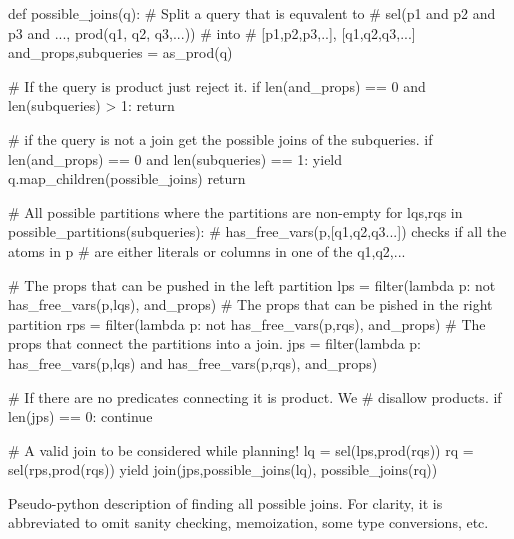 \begin{code}
  \begin{pycode}
    def possible_joins(q):
        # Split a query that is equvalent to
        # sel(p1 and p2 and p3 and ..., prod(q1, q2, q3,...))
        # into
        # [p1,p2,p3,..], [q1,q2,q3,...]
        and_props,subqueries =  as_prod(q)
        
        # If the query is product just reject it.
        if len(and_props) == 0 and len(subqueries) > 1:
            return
            
        # if the query is not a join get the possible joins of the subqueries.
        if len(and_props) == 0 and len(subqueries) == 1:
            yield q.map_children(possible_joins)
            return 
              
        # All possible partitions where the partitions are non-empty
        for lqs,rqs in possible_partitions(subqueries):
            # has_free_vars(p,[q1,q2,q3...]) checks if all the atoms in p
            # are either literals or columns in one of the q1,q2,...
            
            # The props that can be pushed in the left partition
            lps = filter(lambda p: not has_free_vars(p,lqs), and_props)
            # The props that can be pished in the right partition
            rps = filter(lambda p: not has_free_vars(p,rqs), and_props)
            # The props that connect the partitions into a join.
            jps = filter(lambda p: has_free_vars(p,lqs)
                         and has_free_vars(p,rqs),
                         and_props)

            # If there are no predicates connecting it is product. We
            # disallow products.
            if len(jps) == 0: continue

            # A valid join to be considered while planning!
            lq = sel(lps,prod(rqs))
            rq = sel(rps,prod(rqs))
            yield join(jps,possible_joins(lq), possible_joins(rq))
  \end{pycode}
  \caption{\label{lst:possible_joins} Pseudo-python description of
    finding all possible joins. For clarity, it is abbreviated to omit sanity
    checking, memoization, some type conversions, etc.}
\end{code}

